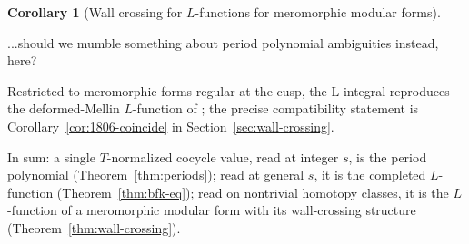 \documentclass[11pt]{article}
\newtheorem{corollary}[theorem]{Corollary}
\numberwithin{equation}{section}  %
\DeclareMathOperator{\Res}{Res}
\begin{document}
\begin{corollary}[Wall crossing for $L$-functions for meromorphic modular forms]
\end{corollary}%

...should we mumble something about period polynomial ambiguities instead, here?

Restricted to meromorphic forms regular at the cusp, the L-integral
reproduces the deformed-Mellin $L$-function of \cite{1806}; the precise
compatibility statement is Corollary~\ref{cor:1806-coincide} in
Section~\ref{sec:wall-crossing}.

In sum: a single $T$-normalized cocycle value, read at integer $s$, is
the period polynomial (Theorem~\ref{thm:periods}); read at general $s$,
it is the completed $L$-function (Theorem~\ref{thm:bfk-eq}); read on
nontrivial homotopy classes, it is the $L$-function of a meromorphic
modular form with its wall-crossing structure
(Theorem~\ref{thm:wall-crossing}).
\end{document}
